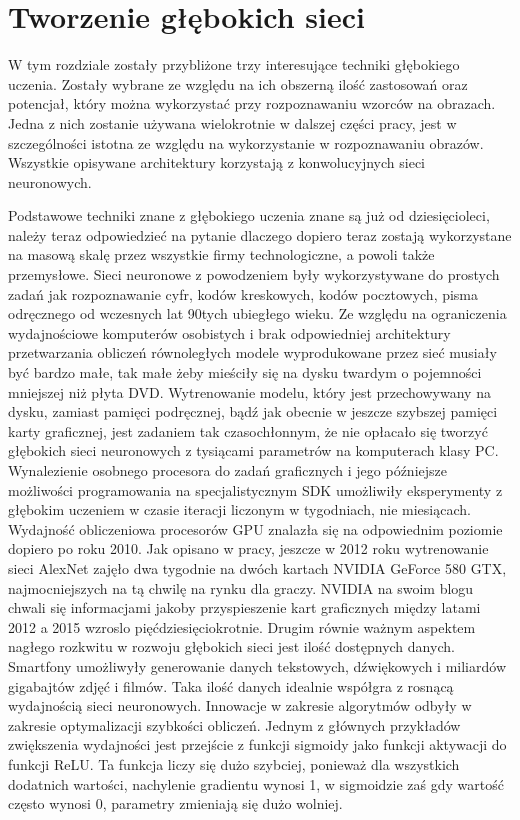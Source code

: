 \documentclass[12pt,a4paper,twoside,titlepage,openright]{book}
\begin{document}
\section{Tworzenie głębokich sieci}
W tym rozdziale zostały przybliżone trzy interesujące techniki głębokiego uczenia. Zostały wybrane ze względu na ich obszerną ilość zastosowań oraz potencjał, który można wykorzystać przy rozpoznawaniu wzorców na obrazach. Jedna z nich zostanie używana wielokrotnie w dalszej części pracy, jest w szczególności istotna ze względu na wykorzystanie w rozpoznawaniu obrazów. Wszystkie opisywane architektury korzystają z konwolucyjnych sieci neuronowych.

Podstawowe techniki znane z głębokiego uczenia znane są już od dziesięcioleci, należy teraz odpowiedzieć na pytanie dlaczego dopiero teraz zostają wykorzystane na masową skalę przez wszystkie firmy technologiczne, a powoli także przemysłowe. Sieci neuronowe z powodzeniem były wykorzystywane do prostych zadań jak rozpoznawanie cyfr, kodów kreskowych, kodów pocztowych, pisma odręcznego od wczesnych lat 90tych ubiegłego wieku. Ze względu na ograniczenia wydajnościowe komputerów osobistych i brak odpowiedniej architektury przetwarzania obliczeń równoległych modele wyprodukowane przez sieć musiały być bardzo małe, tak małe żeby mieściły się na dysku twardym o pojemności mniejszej niż płyta DVD. Wytrenowanie modelu, który jest przechowywany na dysku, zamiast pamięci podręcznej, bądź jak obecnie w jeszcze szybszej pamięci karty graficznej, jest zadaniem tak czasochłonnym, że nie opłacało się tworzyć głębokich sieci neuronowych z tysiącami parametrów na komputerach klasy PC. Wynalezienie osobnego procesora do zadań graficznych i jego późniejsze możliwości programowania na specjalistycznym SDK umożliwiły eksperymenty z głębokim uczeniem w czasie iteracji liczonym w tygodniach, nie miesiącach. Wydajność obliczeniowa procesorów GPU znalazła się na odpowiednim poziomie dopiero po roku 2010. Jak opisano w pracy, jeszcze w 2012 roku wytrenowanie sieci AlexNet zajęło dwa tygodnie na dwóch kartach NVIDIA GeForce 580 GTX, najmocniejszych na tą chwilę na rynku dla graczy. NVIDIA na swoim blogu chwali się informacjami jakoby przyspieszenie kart graficznych między latami 2012 a 2015 wzroslo pięćdziesięciokrotnie.\cite{siteNvidiaAcceleration} Drugim równie ważnym aspektem nagłego rozkwitu w rozwoju głębokich sieci jest ilość dostępnych danych. Smartfony umożliwyły generowanie danych tekstowych, dźwiękowych i miliardów gigabajtów zdjęć i filmów. Taka ilość danych idealnie współgra z rosnącą wydajnością sieci neuronowych. Innowacje w zakresie algorytmów odbyły w zakresie optymalizacji szybkości obliczeń. Jednym z głównych przykładów zwiększenia wydajności jest przejście z funkcji sigmoidy jako funkcji aktywacji do funkcji ReLU. Ta funkcja liczy się dużo szybciej, ponieważ dla wszystkich dodatnich wartości, nachylenie gradientu wynosi 1, w sigmoidzie zaś gdy wartość często wynosi 0, parametry zmieniają się dużo wolniej.
\end{document}
